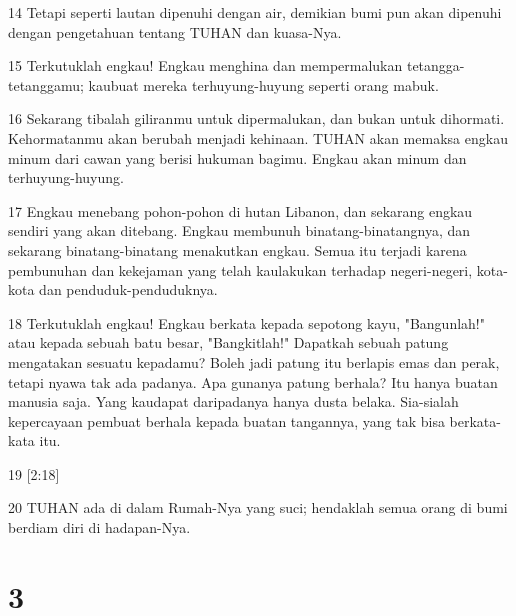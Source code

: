 \par 14 Tetapi seperti lautan dipenuhi dengan air, demikian bumi pun akan dipenuhi dengan pengetahuan tentang TUHAN dan kuasa-Nya.
\par 15 Terkutuklah engkau! Engkau menghina dan mempermalukan tetangga-tetanggamu; kaubuat mereka terhuyung-huyung seperti orang mabuk.
\par 16 Sekarang tibalah giliranmu untuk dipermalukan, dan bukan untuk dihormati. Kehormatanmu akan berubah menjadi kehinaan. TUHAN akan memaksa engkau minum dari cawan yang berisi hukuman bagimu. Engkau akan minum dan terhuyung-huyung.
\par 17 Engkau menebang pohon-pohon di hutan Libanon, dan sekarang engkau sendiri yang akan ditebang. Engkau membunuh binatang-binatangnya, dan sekarang binatang-binatang menakutkan engkau. Semua itu terjadi karena pembunuhan dan kekejaman yang telah kaulakukan terhadap negeri-negeri, kota-kota dan penduduk-penduduknya.
\par 18 Terkutuklah engkau! Engkau berkata kepada sepotong kayu, "Bangunlah!" atau kepada sebuah batu besar, "Bangkitlah!" Dapatkah sebuah patung mengatakan sesuatu kepadamu? Boleh jadi patung itu berlapis emas dan perak, tetapi nyawa tak ada padanya. Apa gunanya patung berhala? Itu hanya buatan manusia saja. Yang kaudapat daripadanya hanya dusta belaka. Sia-sialah kepercayaan pembuat berhala kepada buatan tangannya, yang tak bisa berkata-kata itu.
\par 19 [2:18]
\par 20 TUHAN ada di dalam Rumah-Nya yang suci; hendaklah semua orang di bumi berdiam diri di hadapan-Nya.

\chapter{3}


